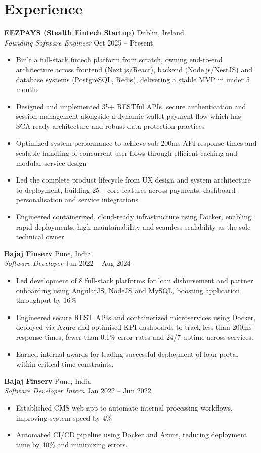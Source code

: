 \documentclass[a4paper,9pt]{article}
\begin{document}
\section*{Experience}
\textbf{EEZPAYS (Stealth Fintech Startup)} \hfill Dublin, Ireland \\
\textit{Founding Software Engineer} \hfill Oct 2025 -- Present
\begin{itemize}[leftmargin=*, itemsep=0.2em]
    \item Built a full-stack fintech platform from scratch, owning end-to-end architecture across frontend (Next.js/React), backend (Node.js/NestJS) and database systems (PostgreSQL, Redis), delivering a stable MVP in under 5 months
    \item Designed and implemented 35+ RESTful APIs, secure authentication and session management alongside a dynamic wallet payment flow which has SCA-ready architecture and robust data protection practices
    \item Optimized system performance to achieve sub-200ms API response times and scalable handling of concurrent user flows through efficient caching and modular service design
    \item Led the complete product lifecycle from UX design and system architecture to deployment, building 25+ core features across payments, dashboard personalisation and service integrations
    \item Engineered containerized, cloud-ready infrastructure using Docker, enabling rapid deployments, high maintainability and seamless scalability as the sole technical owner
\end{itemize}

\textbf{Bajaj Finserv} \hfill Pune, India \\
\textit{Software Developer} \hfill Jun 2022 -- Aug 2024
\begin{itemize}[leftmargin=*]
    \item Led development of 8 full-stack platforms for loan disbursement and partner onboarding using AngularJS, NodeJS and MySQL, boosting application throughput by 16\%
    \item Engineered secure REST APIs and containerized microservices using Docker, deployed via Azure and optimised KPI dashboards to track less than 200ms response times, fewer than 0.1\% error rates and 24/7 uptime across services.
    \item Earned internal awards for leading successful deployment of loan portal within critical time constraints.
\end{itemize}
\textbf{Bajaj Finserv} \hfill Pune, India \\
\textit{Software Developer Intern} \hfill Jan 2022 -- Jun 2022
\begin{itemize}[leftmargin=*]
    \item Established CMS web app to automate internal processing workflows, improving system speed by 4\%
    \item Automated CI/CD pipeline using Docker and Azure, reducing deployment time by 40\% and minimizing errors.
\end{itemize}
\end{document}
